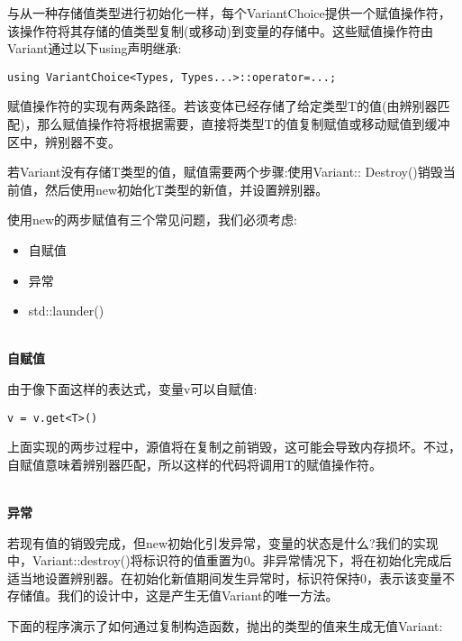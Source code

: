 与从一种存储值类型进行初始化一样，每个VariantChoice提供一个赋值操作符，该操作符将其存储的值类型复制(或移动)到变量的存储中。这些赋值操作符由Variant通过以下using声明继承:

\begin{lstlisting}[style=styleCXX]
using VariantChoice<Types, Types...>::operator=...;
\end{lstlisting}

赋值操作符的实现有两条路径。若该变体已经存储了给定类型T的值(由辨别器匹配)，那么赋值操作符将根据需要，直接将类型T的值复制赋值或移动赋值到缓冲区中，辨别器不变。

若Variant没有存储T类型的值，赋值需要两个步骤:使用Variant:: Destroy()销毁当前值，然后使用new初始化T类型的新值，并设置辨别器。

使用new的两步赋值有三个常见问题，我们必须考虑:

\begin{itemize}
\item
自赋值

\item
异常

\item
std::launder()
\end{itemize}

\hspace*{\fill} \\ %
\noindent
\textbf{自赋值}

由于像下面这样的表达式，变量v可以自赋值:

\begin{lstlisting}[style=styleCXX]
v = v.get<T>()
\end{lstlisting}

上面实现的两步过程中，源值将在复制之前销毁，这可能会导致内存损坏。不过，自赋值意味着辨别器匹配，所以这样的代码将调用T的赋值操作符。

\hspace*{\fill} \\ %
\noindent
\textbf{异常}

若现有值的销毁完成，但new初始化引发异常，变量的状态是什么?我们的实现中，Variant::destroy()将标识符的值重置为0。非异常情况下，将在初始化完成后适当地设置辨别器。在初始化新值期间发生异常时，标识符保持0，表示该变量不存储值。我们的设计中，这是产生无值Variant的唯一方法。

下面的程序演示了如何通过复制构造函数，抛出的类型的值来生成无值Variant:

